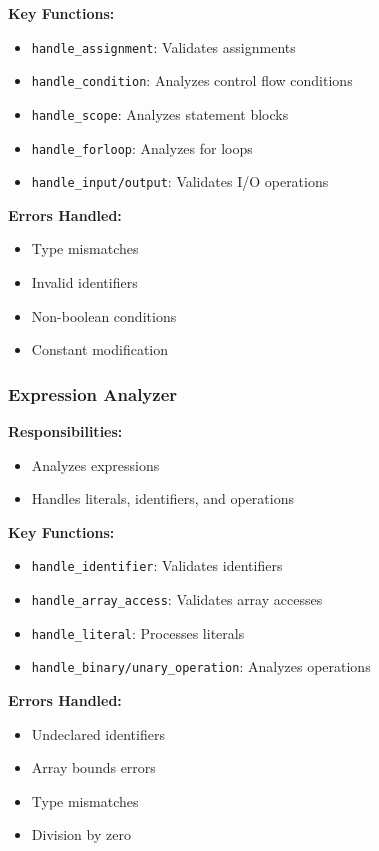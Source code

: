\documentclass[12pt,a4paper]{article}
\begin{document}
\textbf{Key Functions:}
\begin{itemize}
	\item \texttt{handle\_assignment}: Validates assignments
	\item \texttt{handle\_condition}: Analyzes control flow conditions
	\item \texttt{handle\_scope}: Analyzes statement blocks
	\item \texttt{handle\_forloop}: Analyzes for loops
	\item \texttt{handle\_input/output}: Validates I/O operations
\end{itemize}

\textbf{Errors Handled:}
\begin{itemize}
	\item Type mismatches
	\item Invalid identifiers
	\item Non-boolean conditions
	\item Constant modification
\end{itemize}

\subsubsection{Expression Analyzer}

\textbf{Responsibilities:}
\begin{itemize}
	\item Analyzes expressions
	\item Handles literals, identifiers, and operations
\end{itemize}

\textbf{Key Functions:}
\begin{itemize}
	\item \texttt{handle\_identifier}: Validates identifiers
	\item \texttt{handle\_array\_access}: Validates array accesses
	\item \texttt{handle\_literal}: Processes literals
	\item \texttt{handle\_binary/unary\_operation}: Analyzes operations
\end{itemize}

\textbf{Errors Handled:}
\begin{itemize}
	\item Undeclared identifiers
	\item Array bounds errors
	\item Type mismatches
	\item Division by zero
\end{itemize}
\end{document}
